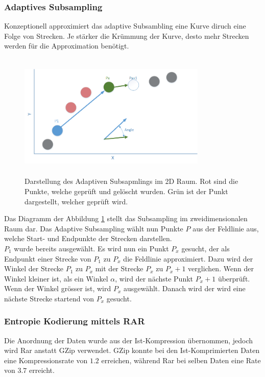 \subsubsection{Adaptives Subsampling}\label{konzept:loesung0:subsampling}
Konzeptionell approximiert das adaptive Subsambling eine Kurve diruch eine Folge von Strecken. Je stärker die Krümmung der Kurve, desto mehr Strecken werden für die Approximation benötigt.
\begin{figure}[!htbp]
	\center
	\includegraphics[width=0.8\textwidth,height=6cm,keepaspectratio]{./pictures/konzept/solution0/anglesubsampling.png}
	\caption{Darstellung des Adaptiven Subsapmlings im 2D Raum. Rot sind die Punkte, welche geprüft und gelöscht wurden. Grün ist der Punkt dargestellt, welcher geprüft wird.}
	\label{konzept:loesung0:angle}
\end{figure}
Das Diagramm der Abbildung \ref{konzept:loesung0:angle} stellt das Subsampling im zweidimensionalen Raum dar. Das Adaptive Subsampling wählt nun Punkte $P$ aus der Feldlinie aus, welche Start- und Endpunkte der Strecken darstellen.\\
$P_1$ wurde bereits ausgewählt. Es wird nun ein Punkt $P_x$ gesucht, der als Endpunkt einer Strecke von $P_1$ zu $P_x$ die Feldlinie approximiert. Dazu wird der Winkel der Strecke $P_1$ zu $P_x$ mit der Strecke $P_x$ zu $P_x+1$ verglichen. Wenn der Winkel kleiner ist, als ein Winkel $\alpha$, wird der nächste Punkt $P_x+1$ überprüft. Wenn der Winkel grösser ist, wird $P_x$ ausgewählt. Danach wird der wird eine nächste Strecke startend von $P_x$ gesucht.

\subsubsection{Entropie Kodierung mittels RAR} \label{konzept:loesung0:kodierung}
Die Anordnung der Daten wurde aus der Ist-Kompression übernommen, jedoch wird Rar anstatt GZip verwendet. GZip konnte bei den Ist-Komprimierten Daten eine Kompressionsrate von $1.2$ erreichen, während Rar bei selben Daten eine Rate von $3.7$ erreicht.
\pagebreak

